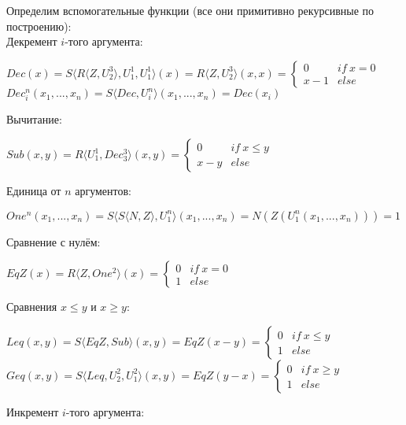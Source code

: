 \documentclass{article}
\begin{document}
\begin{spacing}{1.4}
	Определим вспомогательные функции (все они примитивно рекурсивные по построению):\\
	Декремент $i$-того аргумента: 
	\begin{center}
		$Dec(x) = S \langle R\langle Z, U_2^3 \rangle, U_1^1, U_1^1 \rangle(x) = 
		R\langle Z, U_2^3 \rangle (x, x) = 	
		\begin{cases}
		0 & if \ x = 0 \\
		x - 1 & else
		\end{cases}$\\
		$Dec_i^n(x_1, ..., x_n) = S\langle Dec, U_i^n \rangle (x_1, ..., x_n) = Dec(x_i)$
	\end{center}
	Вычитание:
	\begin{center}
		$Sub(x, y) = R\langle U_1^1, Dec_3^3 \rangle (x, y) = \begin{cases}
		0 & if \ x \leq y \\
		x - y & else
		\end{cases}$\\
	\end{center}
	Единица от $n$ аргументов:
	\begin{center}
		$One^n(x_1, ..., x_n) = S\langle S\langle N, Z \rangle, U_1^n \rangle(x_1, ..., x_n) = N(Z(U_1^n(x_1, ..., x_n))) = 1$\\
	\end{center}
	Сравнение с нулём:
	\begin{center}
		$EqZ(x) = R\langle Z, One^2 \rangle (x) = \begin{cases}
		0 & if \ x = 0 \\
		1 & else
		\end{cases}$\\
	\end{center}
	Сравнения $x \leq y$ и $x \geq y$: 
	\begin{center}
		$Leq(x, y) = S\langle EqZ, Sub \rangle (x, y) = EqZ(x - y) = \begin{cases}
		0 & if \ x \leq y \\
		1 & else
		\end{cases}$\\
		$Geq(x, y) = S\langle Leq, U_2^2, U_1^2 \rangle (x, y) = EqZ(y - x) = \begin{cases}
		0 & if \ x \geq y \\
		1 & else
		\end{cases}$\\
	\end{center}
	Инкремент $i$-того аргумента: 
	\begin{center}

\end{center}
\end{spacing}
\end{document}
